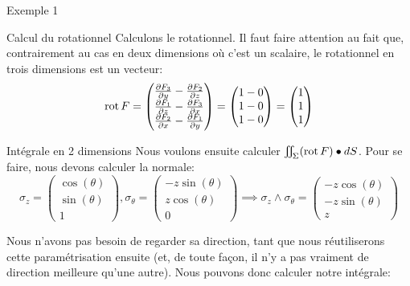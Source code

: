 \documentclass[a4paper]{article}
\begin{document}
\begin{parag}{Exemple 1}
    \begin{subparag}{Calcul du rotationnel}
        Calculons le rotationnel. Il faut faire attention au fait que, contrairement au cas en deux dimensions où c'est un scalaire, le rotationnel en trois dimensions est un vecteur: 
        \[\operatorname{rot} F = \begin{pmatrix} \frac{\partial F_3}{\partial y} - \frac{\partial F_2}{\partial z}  \\ \frac{\partial F_1}{\partial z} - \frac{\partial F_3}{\partial x}  \\ \frac{\partial F_2}{\partial x} - \frac{\partial F_1}{\partial y}  \end{pmatrix} = \begin{pmatrix} 1-0 \\ 1-0 \\ 1-0 \end{pmatrix} = \begin{pmatrix} 1 \\ 1 \\ 1 \end{pmatrix} \]
    \end{subparag}
    
    \begin{subparag}{Intégrale en 2 dimensions}
        Nous voulons ensuite calculer $\iint_{\Sigma} \left(\rot F\right) \dotprod dS$. Pour se faire, nous devons calculer la normale: 
        \[\sigma_z = \begin{pmatrix} \cos\left(\theta\right) \\ \sin\left(\theta\right) \\ 1 \end{pmatrix}, \sigma_{\theta} = \begin{pmatrix} -z\sin\left(\theta\right) \\ z\cos\left(\theta\right) \\ 0 \end{pmatrix} \implies \sigma_z \wedge \sigma_{\theta} = \begin{pmatrix} -z\cos\left(\theta\right) \\ -z\sin\left(\theta\right) \\ z \end{pmatrix} \]

        Nous n'avons pas besoin de regarder sa direction, tant que nous réutiliserons cette paramétrisation ensuite (et, de toute façon, il n'y a pas vraiment de direction meilleure qu'une autre). Nous pouvons donc calculer notre intégrale: 
    \end{subparag}


\end{parag}
\end{document}
